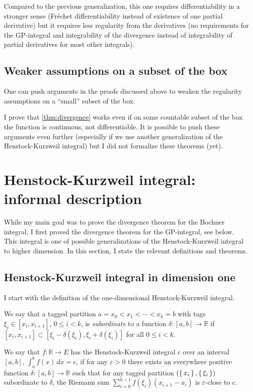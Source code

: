\documentclass[a4paper, UKenglish,cleveref, autoref, thm-restate]{lipics-v2021}
\newcommand{\bbR}{\mathbb{R}}
\newcommand{\eps}{\varepsilon}
\begin{document}
Compared to the previous generalization, this one requires
differentiability in a stronger sense (Fréchet differentiability
instead of existence of one partial derivative) but it requires less
regularity from the derivatives (no requirements for the GP-integral
and integrability of the divergence instead of integrability of
partial derivatives for most other integrals).

\subsection{Weaker assumptions on a subset of the box}

One can push arguments in the proofs discussed above to weaken the
regularity assumptions on a “small” subset of the box.

I prove that \autoref{thm:divergence} works even if on some countable
subset of the box the function is continuous, not differentiable. It
is possible to push these arguments even further (especially if we use
another generalization of the Henstock-Kurzweil integral) but I did
not formalize these theorems (yet).

\section{Henstock-Kurzweil integral: informal description}\label{sec:henst-kurzw-informal}

While my main goal was to prove the divergence theorem for the Bochner
integral, I first proved the divergence theorem for the GP-integral,
see below. This integral is one of possible generalizations of the
Henstock-Kurzweil integral to higher dimension. In this section, I
state the relevant definitions and theorems.

\subsection{Henstock-Kurzweil integral in dimension one}\label{sec:HK-integral-dim1}
I start with the definition of the one-dimensional Henstock-Kurzweil
integral.

\begin{definition}%
  \label{def:Henstock}
  We say that a tagged partition \(a=x_{0}<x_{1}<\cdots<x_{k}=b\) with
  tags \(\xi_{i}\in[x_{i}, x_{i+1}]\), \(0\le i<k\), is
  \emph{subordinate} to a function \(\delta\colon[a, b]\to \bbR\) if
  \([x_{i}, x_{i+1}]\subset [\xi_{i}-\delta(\xi_{i}),
  \xi_{i}+\delta(\xi_{i})]\) for all \(0\le i<k\).

  We say that \(f\colon \bbR\to E\) has the Henstock-Kurzweil integral
  \(c\) over an interval \([a, b]\), \(\int_{a}^{b}f(x)\,dx=c\), if
  for any \(\eps>0\) there exists an everywhere positive function
  \(\delta\colon [a, b]\to \bbR\) such that for any tagged partition
  \((\set{x_{i}}, \set{\xi_{i}})\) subordinate to \(\delta\), the
  Riemann sum
  \(\displaystyle\sum_{i=0}^{k-1}f(\xi_{i})(x_{i+1}-x_{i}) \) is
  \(\eps\)-close to \(c\).
\end{definition}
\end{document}
